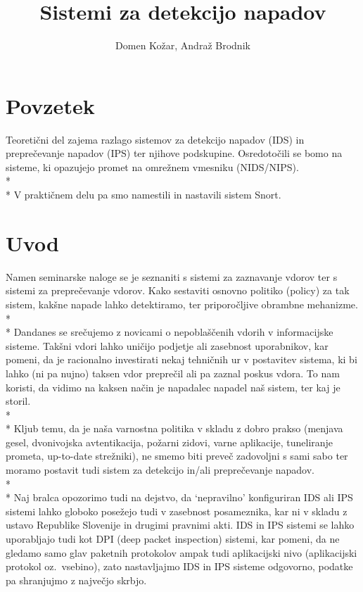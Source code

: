 \documentclass[12pt]{article}
\title{Sistemi za detekcijo napadov}
\author{Domen Kožar, Andraž Brodnik}
\let\stdsection\section
\renewcommand\section{\newpage\stdsection}
\begin{document}
\maketitle

\tableofcontents

\section{Povzetek}
Teoretični del zajema razlago sistemov za detekcijo napadov (IDS) in preprečevanje napadov (IPS) 
ter njihove podskupine. 
Osredotočili se bomo na sisteme, ki opazujejo promet na omrežnem vmesniku (NIDS/NIPS).
\\*
\\*
V praktičnem delu pa smo namestili in nastavili sistem Snort.

\section{Uvod}

Namen seminarske naloge se je seznaniti s sistemi za zaznavanje vdorov ter s sistemi za preprečevanje vdorov. 
Kako sestaviti osnovno politiko (policy) za tak sistem, kakšne napade lahko detektiramo, ter priporočljive obrambne mehanizme.
\\*
\\*
Dandanes se srečujemo z novicami o nepoblaščenih vdorih v informacijske sisteme.
Takšni vdori lahko uničijo podjetje ali zasebnost uporabnikov,
kar pomeni, da je racionalno investirati nekaj tehničnih ur v postavitev sistema, ki bi lahko (ni pa nujno) taksen vdor preprečil ali pa zaznal poskus vdora.
To nam koristi, da vidimo na kaksen način je napadalec napadel naš sistem, ter kaj je storil. 
\\*
\\*
Kljub temu, da je naša varnostna politika v skladu z dobro prakso (menjava gesel, dvonivojska avtentikacija, požarni zidovi,
varne aplikacije, tuneliranje prometa, up-to-date strežniki), ne smemo biti preveč zadovoljni s sami sabo ter moramo postavit tudi sistem za detekcijo in/ali preprečevanje napadov.
\\*
\\*
Naj bralca opozorimo tudi na dejstvo, da `nepravilno' konfiguriran IDS ali IPS sistemi lahko globoko posežejo
tudi v zasebnost posameznika, kar ni v skladu z ustavo Republike Slovenije in drugimi pravnimi akti.
IDS in IPS sistemi se lahko uporabljajo tudi kot DPI (deep packet inspection) sistemi, kar pomeni, da ne gledamo
samo glav paketnih protokolov ampak tudi aplikacijski nivo (aplikacijski protokol oz.\ vsebino), 
zato nastavljajmo IDS in IPS sisteme odgovorno, podatke pa shranjujmo z največjo skrbjo.
\end{document}
